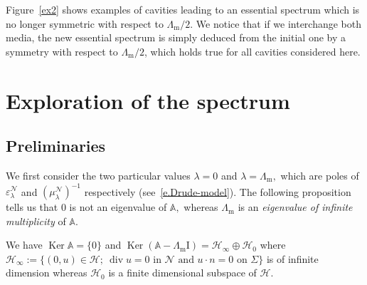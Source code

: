 \documentclass[AHL,Unicode,longabstracts]{cedram}
\DeclareMathOperator{\Div}{div}
\DeclareMathOperator{\Ker}{Ker}
\newcommand{\epsl}{\varepsilon}
\newcommand{\calH}{\mathcal{H}}
\newcommand{\calN}{\mathcal{N}}
\newcommand{\bbA}{\mathbb{A}}
\newcommand{\Ident}{{\mathrm{I}}}
\newcommand{\Lm}{{\Lambda_{\mathrm{m}}}}
\begin{document}
Figure~\ref{ex2} shows examples of cavities leading to an essential spectrum which is no longer symmetric with respect to $\Lm/2$. We notice that if we interchange both media, the new essential spectrum is simply deduced from the initial one by a symmetry with respect to $\Lm/2$, which holds true for all cavities considered here.


\section{Exploration of the spectrum}\label{s-investigation}

\subsection{Preliminaries}\label{s-prelimin}

We first consider the two particular values $\lambda = 0$ and $\lambda = \Lm,$ which are poles of $\epsl_\lambda^\calN$ and $(\mu_\lambda^\calN)^{-1}$ respectively (see~\eqref{e.Drude-model}). The following proposition tells us that $0$ is not an eigenvalue of $\bbA,$ whereas $\Lm$ is an \emph{eigenvalue of infinite multiplicity} of $\bbA.$

\begin{prop}\label{p.partic-values}
We have $\Ker \bbA = \{0\}$ and $\Ker(\bbA - \Lm\Ident) = \calH_\infty \oplus \calH_0$ where $\calH_\infty := \big\{(0,u) \in \calH;\ \Div u = 0 \text{ in }\calN \text{ and } u \cdot n = 0 \text{ on }\Sigma \big\}$ is of infinite dimension whereas $\calH_0$ is a finite dimensional subspace of $\calH.$
\end{prop}
\end{document}
